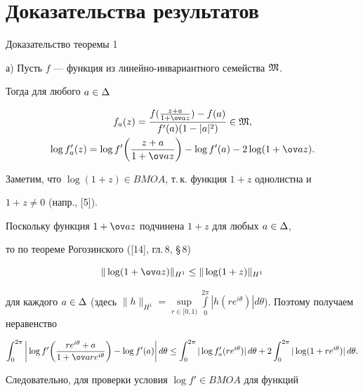 \section{Доказательства результатов}





\begin{pf*}{Доказательство теоремы 1}


а) Пусть $f$ --- функция из линейно-инвариантного семейства $\frak M$. 


Тогда для любого $a\in\Delta$


\begin{gather*}


f_a(z)=\frac{f(\frac{z+a}{1+\ov a z})-f(a)}{f'(a)(1-|a|^2)}\in


\frak M,\\


\log f_a'(z)=\log f'\bigg(\frac{z+a}{1+\ov a z}\bigg)-


\log f'(a)-2\log (1+\ov a z).


\end{gather*} 


Заметим, что $\log(1+z)\in BMOA$, т.\,к. функция $1+z$ однолистна и


$1+z\neq 0$ (напр., [5]).


Поскольку функция $1+\ov az$ подчинена $1+z$ для любых $a\in\Delta$,


то по теореме Рогозинского ([14], гл.\,8, \S\,8)


$$


\|\log (1+\ov az)\|_{H^1}\leq \|\log (1+z)\|_{H^1}


$$


для каждого $a\in\De$ (здесь $\|h\|_{H^1}=


\sup\limits_{r\in[0,1)}\int\limits_0^{2\pi}|h(re^


{i\theta})|d\theta$). Поэтому получаем неравенство


$$


\int_0^{2\pi}\bigg|\log f'\bigg(


\frac{re^{i\theta}+a}{1+\ov a re^{i\theta}}\bigg)-


\log f'(a)\bigg|\, d\theta\leq


\int_0^{2\pi}|\log f_a'(re^{i\theta})|\, d\theta+


2\int_0^{2\pi}|\log (1+re^{i\theta})|\, d\theta.


$$


Следовательно, для проверки условия $\log f'\in BMOA$ для функций



\end{pf*}
